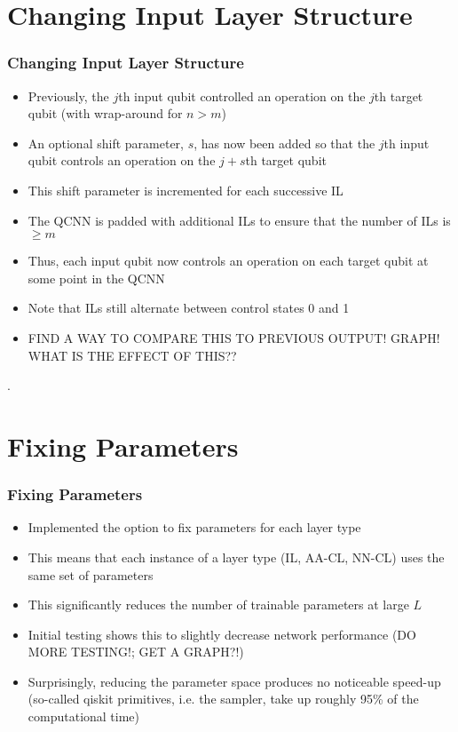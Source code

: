 \documentclass{beamer}
\begin{document}
\section{Changing Input Layer Structure}

\begin{frame}
\frametitle{Changing Input Layer Structure}
\begin{itemize}
\item Previously, the $j$th input qubit controlled an operation on the $j$th target qubit (with wrap-around for $n >m$) 
\item An optional \alert{shift parameter}, $s$, has now been added so that the $j$th input qubit controls an operation on the $j+s$th target qubit 
\item This shift parameter is incremented for each successive IL 
\item The QCNN is padded with additional ILs to ensure that the number of ILs is $\geq m$ 
\item Thus, \alert{each input qubit now controls an operation on each target qubit} at some point in the QCNN 
\item Note that ILs still alternate between control states 0 and 1
\item FIND A WAY TO COMPARE THIS TO PREVIOUS OUTPUT! GRAPH! WHAT IS THE EFFECT OF THIS??
\end{itemize}.
\end{frame}

\section{Fixing Parameters}

\begin{frame}
\frametitle{Fixing Parameters}
\begin{itemize}
\item Implemented the option to \alert{fix parameters for each layer type}
\item This means that each instance of a layer type (IL, AA-CL, NN-CL) uses the same set of parameters 
\item This significantly \alert{reduces the number of trainable parameters} at large $L$
\item Initial testing shows this to slightly decrease network performance (DO MORE TESTING!; GET A GRAPH?!) 
\item Surprisingly, reducing the parameter space \alert{produces no noticeable speed-up} (so-called qiskit primitives, i.e. the sampler, take up roughly 95\% of the computational time)
\end{itemize}
\end{frame}
\end{document}
